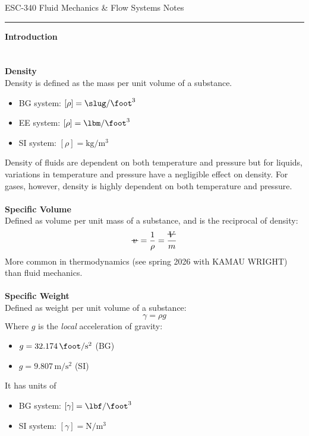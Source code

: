 ﻿\documentclass[12pt]{article}
\newcommand{\vol}{\mathord{\text{\ooalign{\hidewidth $V$\hidewidth\cr\kern-0.5pt\raisebox{0.8ex}{\rule[0pt]{1em}{0.5pt}}}}}}
\newcommand{\svol}{%
  \mathord{\text{\ooalign{%
    \hfil$v$\hfil\cr
    \hfil\rule[0.6ex]{0.8em}{0.5pt}\hfil
  }}}%
}
\begin{document}
\begin{center}
{\LARGE ESC-340 Fluid Mechanics \& Flow Systems Notes\par}
\end{center}
\hrule
\vspace{1.5em}
\begin{center}
    {\LARGE\bfseries Introduction\par}
\end{center}
\section*{}
\textbf{Density}\\
Density is defined as the mass per unit volume of a substance.
\begin{itemize}
    \item BG system: $[\rho] = \unit{\slug\per\cubic\foot}$
    \item EE system: $[\rho] = \unit{\lbm\per\cubic\foot}$
    \item SI system: $[\rho] = \unit{\kilogram\per\cubic\meter}$
\end{itemize}
Density of fluids are dependent on both temperature and pressure but for liquids, variations in temperature and pressure have a negligible effect on density. For gases, however, density is highly dependent on both temperature and pressure.\\\\
\textbf{Specific Volume}\\
Defined as volume per unit mass of a substance, and is the reciprocal of density:
\[\svol = \frac{1}{\rho} = \frac{\vol}{m}\]
More common in thermodynamics (see spring 2026 with KAMAU WRIGHT) than fluid mechanics.\\\\
\textbf{Specific Weight}\\
Defined as weight per unit volume of a substance:
\[\gamma = \rho g\]
Where $g$ is the \textit{local} acceleration of gravity:
\begin{itemize}
    \item $g = 32.174\,\unit{\foot\per\second\squared}$ (BG)
    \item $g = 9.807\,\unit{\meter\per\second\squared}$ (SI)
\end{itemize}
It has units of 
\begin{itemize}
    \item BG system: $[\gamma] = \unit{\lbf\per\cubic\foot}$
    \item SI system: $[\gamma] = \unit{\newton\per\cubic\meter}$
\end{itemize}
\end{document}
